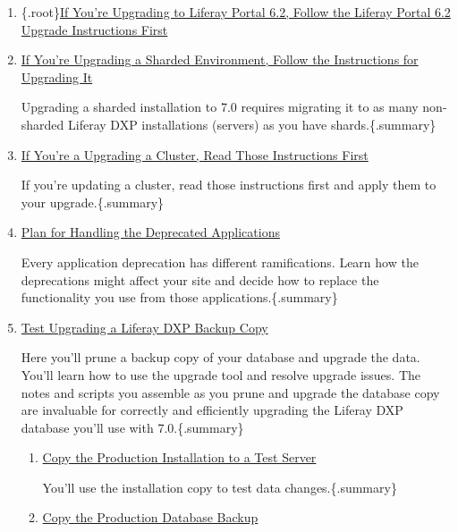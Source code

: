 \begin{enumerate}
\def\labelenumi{\arabic{enumi}.}
\item
  \{.root\}\href{/docs/6-2/deploy/-/knowledge_base/d/upgrading-liferay}{If
  You're Upgrading to Liferay Portal 6.2, Follow the Liferay Portal 6.2
  Upgrade Instructions First}
\item
  \href{/docs/7-2/deploy/-/knowledge_base/d/upgrading-a-sharded-environment}{If
  You're Upgrading a Sharded Environment, Follow the Instructions for
  Upgrading It}

  Upgrading a sharded installation to 7.0 requires migrating it to as
  many non-sharded Liferay DXP installations (servers) as you have
  shards.\{.summary\}
\item
  \href{/docs/7-2/deploy/-/knowledge_base/d/updating-a-cluster}{If
  You're a Upgrading a Cluster, Read Those Instructions First}

  If you're updating a cluster, read those instructions first and apply
  them to your upgrade.\{.summary\}
\item
  \href{/docs/7-2/deploy/-/knowledge_base/d/planning-for-deprecated-applications}{Plan
  for Handling the Deprecated Applications}

  Every application deprecation has different ramifications. Learn how
  the deprecations might affect your site and decide how to replace the
  functionality you use from those applications.\{.summary\}
\item
  \href{/docs/7-2/deploy/-/knowledge_base/d/test-upgrading-a-product-backup-copy}{Test
  Upgrading a Liferay DXP Backup Copy}

  Here you'll prune a backup copy of your database and upgrade the data.
  You'll learn how to use the upgrade tool and resolve upgrade issues.
  The notes and scripts you assemble as you prune and upgrade the
  database copy are invaluable for correctly and efficiently upgrading
  the Liferay DXP database you'll use with 7.0.\{.summary\}

  \begin{enumerate}
  \def\labelenumii{\arabic{enumii}.}
  \item
    \href{/docs/7-2/deploy/-/knowledge_base/d/test-upgrading-a-product-backup-copy\#copy-the-production-installation-to-a-test-server}{Copy
    the Production Installation to a Test Server}

    You'll use the installation copy to test data changes.\{.summary\}
  \item
    \href{/docs/7-2/deploy/-/knowledge_base/d/test-upgrading-a-product-backup-copy\#copy-the-production-backup-to-the-test-database}{Copy
    the Production Database Backup}


\end{enumerate}
\end{enumerate}
